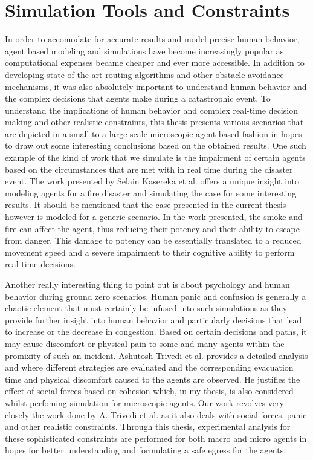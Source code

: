 \section{Simulation Tools and Constraints}
\label{sec:pastwork:Simulation Tool and Constraints}

In order to accomodate for accurate results and model precise human behavior, agent based modeling and simulations have become increasingly popular as computational expenses became cheaper and ever more accessible. In addition to developing state of the art routing algorithms and other obstacle avoidance mechanisms, it was also absolutely important to understand human behavior and the complex decisions that agents make during a catastrophic event. To understand the implications of human behavior and complex real-time decision making and other realistic constraints, this thesis presents various scenarios that are depicted in a small to a large scale microscopic agent based fashion in hopes to draw out some interesting conclusions based on the obtained results. One such example of the kind of work that we simulate is the impairment of certain agents based on the circumstances that are met with in real time during the disaster event. The work presented by Selain Kasereka et al. \cite{ref20} offers a unique insight into modeling agents for a fire disaster and simulating the case for some interesting results. It should be mentioned that the case presented in the current thesis however is modeled for a generic scenario. In the work presented, the smoke and fire can affect the agent, thus reducing their potency and their ability to escape from danger. This damage to potency can be essentially translated to a reduced movement speed and a severe impairment to their cognitive ability to perform real time decisions. 

Another really interesting thing to point out is about psychology and human behavior during ground zero scenarios. Human panic and confusion is generally a chaotic element that must certainly be infused into such simulations as they provide further insight into human behavior and particularly decisions that lead to increase or the decrease in congestion. Based on certain decisions and paths, it may cause discomfort or physical pain to some and many agents within the promixity of such an incident. Ashutosh Trivedi et al. \cite{ref21} provides a detailed analysis and where different strategies are evaluated and the corresponding evacuation time and physical discomfort caused to the agents are observed. He justifies the effect of social forces based on cohesion which, in my thesis, is also considered whilst perfoming simulation for microscopic agents. Our work revolves very closely the work done by A. Trivedi et al. as it also deals with social forces, panic and other realistic constraints. Through this thesis, experimental analysis for these sophisticated constraints are performed for both macro and micro agents in hopes for better understanding and formulating a safe egress for the agents.

